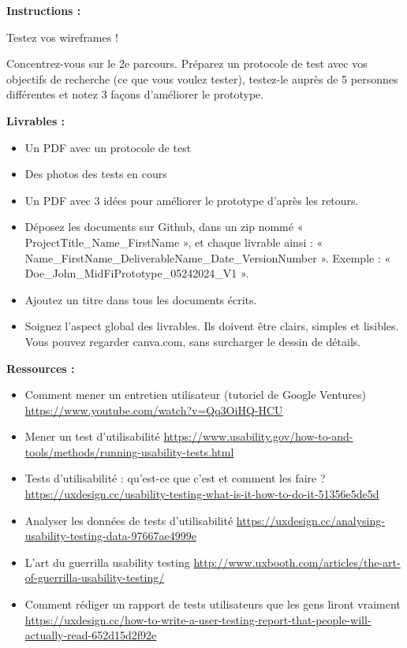 \makeheaderfiles

\textbf{Instructions :}

Testez vos wireframes !

Concentrez-vous sur le 2e parcours. Préparez un protocole de test avec vos objectifs de recherche (ce que vous voulez tester), testez-le auprès de 5 personnes différentes et notez 3 façons d'améliorer le prototype.

\textbf{Livrables :}

\begin{itemize}
\item Un PDF avec un protocole de test
\item Des photos des tests en cours
\item Un PDF avec 3 idées pour améliorer le prototype d'après les retours.
\item Déposez les documents sur Github, dans un zip nommé « ProjectTitle\_Name\_FirstName », et chaque livrable ainsi : « Name\_FirstName\_DeliverableName\_Date\_VersionNumber ». Exemple : « Doe\_John\_MidFiPrototype\_05242024\_V1 ».
\item Ajoutez un titre dans tous les documents écrits.
\item Soignez l'aspect global des livrables. Ils doivent être clairs, simples et lisibles. Vous pouvez regarder canva.com, sans surcharger le dessin de détails.
\end{itemize}

\textbf{Ressources :}

\begin{itemize}
\item Comment mener un entretien utilisateur (tutoriel de Google Ventures) \url{https://www.youtube.com/watch?v=Qq3OiHQ-HCU}
\item Mener un test d'utilisabilité \url{https://www.usability.gov/how-to-and-tools/methods/running-usability-tests.html}
\item Tests d'utilisabilité : qu'est-ce que c'est et comment les faire ? \url{https://uxdesign.cc/usability-testing-what-is-it-how-to-do-it-51356e5de5d}
\item Analyser les données de tests d'utilisabilité \url{https://uxdesign.cc/analysing-usability-testing-data-97667ae4999e}
\item L'art du guerrilla usability testing \url{http://www.uxbooth.com/articles/the-art-of-guerrilla-usability-testing/}
\item Comment rédiger un rapport de tests utilisateurs que les gens liront vraiment \url{https://uxdesign.cc/how-to-write-a-user-testing-report-that-people-will-actually-read-652d15d2f92e}
\end{itemize}

